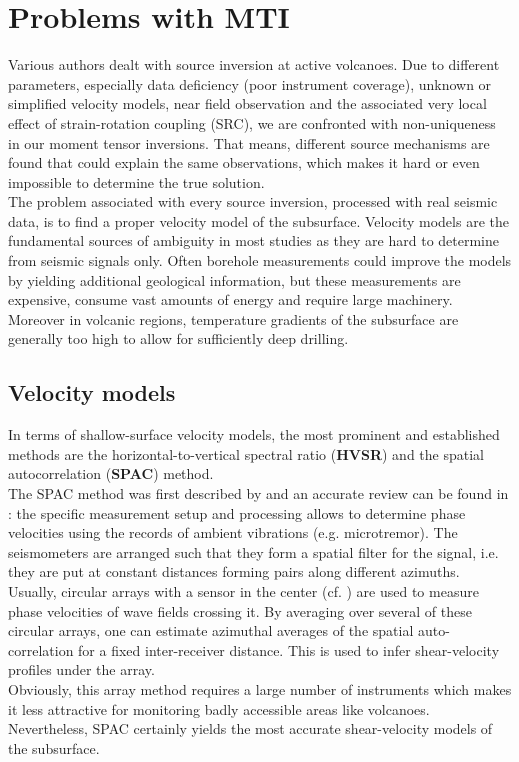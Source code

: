 \documentclass[12pt, a4paper]{article}
\begin{document}
\section*{Problems with MTI}
Various authors dealt with source inversion at active volcanoes. Due to different parameters, especially data deficiency (poor instrument coverage), unknown or simplified velocity models, near field observation and the associated very local effect of strain-rotation coupling (SRC), we are confronted with non-uniqueness in our moment tensor inversions. That means, different source mechanisms are found that could explain the same observations, which makes it hard or even impossible to determine the true solution.\\
The problem associated with every source inversion, processed with real seismic data, is to find a proper velocity model of the subsurface. Velocity models are the fundamental sources of ambiguity in most studies as they are hard to determine from seismic signals only. Often borehole measurements could improve the models by yielding additional geological information, but these measurements are expensive, consume vast amounts of energy and require large machinery. Moreover in volcanic regions, temperature gradients of the subsurface are generally too high to allow for sufficiently deep drilling.
\subsection*{Velocity models}
In terms of shallow-surface velocity models, the most prominent and established methods are the horizontal-to-vertical spectral ratio (\textbf{HVSR}) and the spatial autocorrelation (\textbf{SPAC}) method.\\
The SPAC method was first described by \citet{Aki1957} and an accurate review can be found in \citet{Chavez2005}: the specific measurement setup and processing allows to determine phase velocities using the records of ambient vibrations (e.g. microtremor). The seismometers are arranged such that they form a spatial filter for the signal, i.e. they are put at constant distances forming pairs along different azimuths. Usually, circular arrays with a sensor in the center (cf. \citet{Aki1965}) are used to measure phase velocities of wave fields crossing it. By averaging over several of these circular arrays, one can estimate azimuthal averages of the spatial auto-correlation for a fixed inter-receiver distance. This is used to infer shear-velocity profiles under the array.\\
Obviously, this array method requires a large number of instruments which makes it less attractive for monitoring badly accessible areas like volcanoes. Nevertheless, SPAC certainly yields the most accurate shear-velocity models of the subsurface.\\
\end{document}
